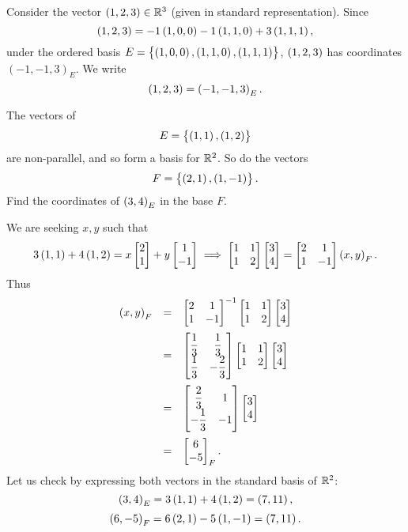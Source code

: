 \begin{exa}
Consider the vector $\left( 1, 2, 3 \right)\in \mathbb{R}^3$ (given in
standard representation). Since
$$ \left( 1, 2, 3 \right) =    -1\left( 1, 0,
0 \right) -1 \left( 1, 1,
0 \right) +  3\left( 1, 1,
1 \right),     $$under the
ordered basis $\displaystyle{E = \left\{\left( 1, 0,
0 \right), \left( 1, 1,
0 \right), \left( 1, 1,
1 \right)\right\}}$, $\left( 1, 2, 3 \right) $ has coordinates $(-1, -1,
3)_{E}$. We write
$$ \left( 1, 2, 3 \right) = \left( -1, -1, 3 \right)_{E}.  $$
\end{exa}
\begin{exa}
The vectors of $$E= \left\{\left( 1 , 1 \right), \left( 1,
2 \right)\right\}$$are non-parallel, and so form a basis for
$\mathbb{R}^2$. So do the vectors $$F = \left\{\left( 2 ,
1 \right), \left( 1, -1 \right)\right\}.$$Find the coordinates of  $\left( 3,
4 \right)_{E}$ in the base $F$.
\end{exa}
\begin{solu}We are seeking $x, y$ such that
$$ 3\left( 1, 1 \right) + 4\left( 1 , 2 \right)  = x\begin{bmatrix} 2 \\ 1 \end{bmatrix} + y\begin{bmatrix} 1 \\ -1 \end{bmatrix}
\implies \begin{bmatrix}1 & 1 \cr 1 & 2 \end{bmatrix}\begin{bmatrix} 3 \\
4 \end{bmatrix} =
\begin{bmatrix}2 & 1 \cr 1 & -1 \cr
\end{bmatrix}\left( x , y \right)_{F} . $$
Thus $$\begin{array}{lll} \coord{x,
y}_{F} & = &
\begin{bmatrix}2 & 1 \cr 1 & -1 \cr
\end{bmatrix}^{-1}\begin{bmatrix}1 & 1 \cr 1 & 2 \end{bmatrix}\colvec{3 \\
4} \vspace{2mm}\\
& = & \begin{bmatrix} \dfrac{1}{3} & \dfrac{1}{3} \cr \dfrac{1}{3} & -\dfrac{2}{3} \cr \end{bmatrix} \begin{bmatrix}1 & 1 \cr 1 & 2 \end{bmatrix}\colvec{3 \\
4} \vspace{2mm} \\
& = & \begin{bmatrix}\dfrac{2}{3} & 1 \cr -\dfrac{1}{3} & -1 \cr  \end{bmatrix}\colvec{3 \\
4}  \vspace{2mm}\\
& = & \colvec{6 \\ -5}_{F}.
\end{array}$$
Let us check  by expressing both vectors in the standard basis of
$\mathbb{R}^2$:
$$\left( 3 , 4 \right)_{E} = 3\left( 1, 1 \right) + 4\left( 1 , 2 \right) = \left( 7, 11 \right),$$
$$\left( 6 , -5 \right)_{F} = 6\left( 2, 1 \right) - 5\left( 1 , -1 \right) = \left( 7, 11 \right).$$
\end{solu}

